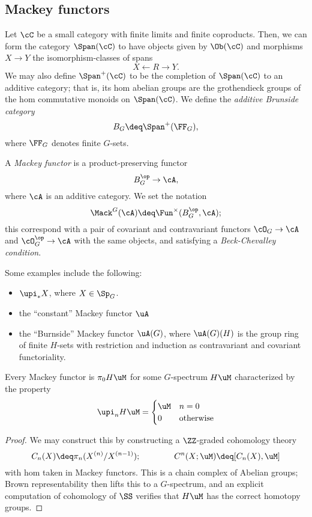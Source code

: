 \subsection{Mackey functors}%
\begin{definition}
  Let $\cC$ be a small category with finite limits and finite coproducts.
  Then, we can form the category $\Span(\cC)$ to have objects given by $\Ob(\cC)$ and morphisms $X \rightarrow Y$ the isomorphism-classes of spans
  \[
    X \leftarrow R \rightarrow Y.
  \]
  We may also define $\Span^+(\cC)$ to be the completion of $\Span(\cC)$ to an additive category;
  that is, its hom abelian groups are the grothendieck groups of the hom commutative monoids on $\Span(\cC)$.
  We define the \emph{additive Brunside category}
  \[
    B_G \deq \Span^+(\FF_G),
  \]
  where $\FF_G$ denotes finite $G$-sets.
\end{definition}
\begin{definition}
  A \emph{Mackey functor} is a product-preserving functor
  \[
    B_G^{\op} \rightarrow \cA,
  \]
  where $\cA$ is an additive category.
  We set the notation
  \[
    \Mack^G(\cA) \deq \Fun^{\times}(B_G^{\op},\cA);
  \]
  this correspond with a pair of covariant and contravariant functors $\cO_G \rightarrow \cA$ and $\cO_G^{\op} \rightarrow \cA$ with the same objects, and satisfying a \emph{Beck-Chevalley condition}.
\end{definition}
\begin{example}
  Some examples include the following:
  \begin{itemize}
    \item $\upi_* X$, where $X \in \Sp_G$.
    \item the ``constant'' Mackey functor $\uA$ 
    \item the ``Burnside'' Mackey functor $\uA(G)$, where $\uA(G)(H)$ is the group ring of finite $H$-sets with restriction and induction as contravariant and covariant functoriality.
  \end{itemize}
\end{example}

\begin{claim}
  Every Mackey functor is $\pi_0 H\uM$ for some $G$-spectrum $H\uM$ characterized by the property
  \[
    \upi_n H\uM = \begin{cases}
      \uM & n=0 \\ 
      0 & \mathrm{otherwise} 
    \end{cases}
  \]
\end{claim}
\begin{proof}
  We may construct this by constructing a $\ZZ$-graded cohomology theory
  \[
    C_n(X) \deq \pi_n(X^{(n)}/X^{(n-1)}); \hspace{40pt} C^n(X;\uM) \deq [C_n(X), \uM]
  \]
  with hom taken in Mackey functors.
  This is a chain complex of Abelian groups;
  Brown representability then lifts this to a $G$-spectrum, and an explicit computation of cohomology of $\SS$ verifies that $H\uM$ has the correct homotopy groups.
\end{proof}

